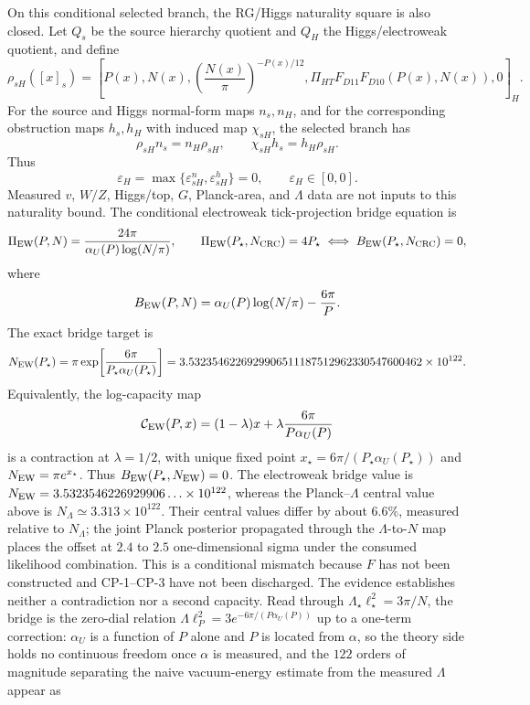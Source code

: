 \documentclass[11pt]{article}
\begin{document}
On this conditional selected branch, the RG/Higgs naturality square is also closed. Let \(Q_s\) be the
source hierarchy quotient and \(Q_H\) the Higgs/electroweak quotient, and define
\[
\rho_{sH}([x]_s)=
\left[
P(x),N(x),
\left(\frac{N(x)}{\pi}\right)^{-P(x)/12},
\Pi_{HT}F_{D11}F_{D10}(P(x),N(x)),0
\right]_H .
\]
For the source and Higgs normal-form maps \(n_s,n_H\), and for the corresponding obstruction
maps \(h_s,h_H\) with induced map \(\chi_{sH}\), the selected branch has
\[
\rho_{sH}n_s=n_H\rho_{sH},
\qquad
\chi_{sH}h_s=h_H\rho_{sH}.
\]
Thus
\[
\varepsilon_H
=
\max\{\varepsilon^n_{sH},\varepsilon^h_{sH}\}
=0,
\qquad
\varepsilon_H\in[0,0].
\]
Measured \(v\), \(W/Z\), Higgs/top, \(G\), Planck-area, and \(\Lambda\) data are not inputs to
this naturality bound. The conditional electroweak tick-projection bridge equation is
\[
\Pi_{\rm EW}(P,N)=\frac{24\pi}{\alpha_U(P)\log(N/\pi)},\qquad
\Pi_{\rm EW}(P_\star,N_{\rm CRC})=4P_\star
\iff
B_{\rm EW}(P_\star,N_{\rm CRC})=0,
\]
where
\[
B_{\rm EW}(P,N)=\alpha_U(P)\log(N/\pi)-\frac{6\pi}{P}.
\]
The exact bridge target is
\[
N_{\rm EW}(P_\star)
=\pi\exp\!\left[\frac{6\pi}{P_\star\alpha_U(P_\star)}\right]
=3.5323546226929906511187512962330547600462\times10^{122}.
\]
Equivalently, the log-capacity map
\[
\mathcal C_{\rm EW}(P,x)
=(1-\lambda)x+\lambda\frac{6\pi}{P\alpha_U(P)}
\]
is a contraction at \(\lambda=1/2\), with unique fixed point
\(x_\star=6\pi/(P_\star\alpha_U(P_\star))\) and
\(N_{\rm EW}=\pi e^{x_\star}\). Thus
\(B_{\rm EW}(P_\star,N_{\rm EW})=0\).  The electroweak bridge value is
\(N_{\rm EW}=3.5323546226929906\ldots\times10^{122}\), whereas the
Planck--\(\Lambda\) central value above is
\(N_{\Lambda}\simeq3.313\times10^{122}\).  Their central values differ by
about \(6.6\%\), measured relative to \(N_{\Lambda}\); the joint Planck
posterior propagated through the \(\Lambda\)-to-\(N\) map places the offset at
\(2.4\) to \(2.5\) one-dimensional sigma under the consumed likelihood
combination.  This is a conditional
mismatch because \(F\) has not been constructed and CP-1--CP-3 have not been
discharged.  The evidence establishes neither a contradiction nor a second capacity.
Read through \(\Lambda_\star\ell_\star^2=3\pi/N\), the bridge is the zero-dial
relation \(\Lambda\ell_P^2=3e^{-6\pi/(P\alpha_U(P))}\) up to a one-term
correction: \(\alpha_U\) is a function of \(P\) alone and \(P\) is located
from \(\alpha\), so the theory side holds no continuous freedom once
\(\alpha\) is measured, and the \(122\) orders of magnitude separating the
naive vacuum-energy estimate from the measured \(\Lambda\) appear as
\end{document}
